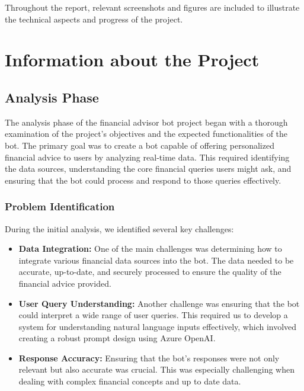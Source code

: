 \documentclass[a4paper,12pt]{report}
\begin{document}
Throughout the report, relevant screenshots and figures are included to illustrate the technical aspects and progress of the project. 


\chapter{Information about the Project}

\section{Analysis Phase}
The analysis phase of the financial advisor bot project began with a thorough examination of the project's objectives and the expected functionalities of the bot. The primary goal was to create a bot capable of offering personalized financial advice to users by analyzing real-time data. This required identifying the data sources, understanding the core financial queries users might ask, and ensuring that the bot could process and respond to those queries effectively.

\subsection*{Problem Identification}
During the initial analysis, we identified several key challenges:
\begin{itemize}
    \item \textbf{Data Integration:} One of the main challenges was determining how to integrate various financial data sources into the bot. The data needed to be accurate, up-to-date, and securely processed to ensure the quality of the financial advice provided.
    \item \textbf{User Query Understanding:} Another challenge was ensuring that the bot could interpret a wide range of user queries. This required us to develop a system for understanding natural language inputs effectively, which involved creating a robust prompt design using Azure OpenAI.
    \item \textbf{Response Accuracy:} Ensuring that the bot's responses were not only relevant but also accurate was crucial. This was especially challenging when dealing with complex financial concepts and up to date data.
\end{itemize}
\end{document}
